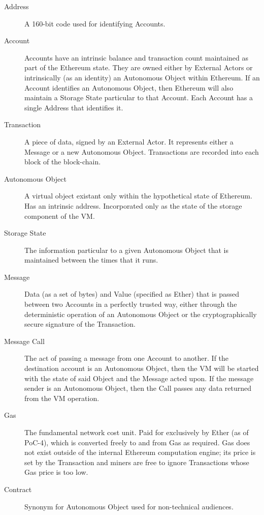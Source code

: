 \documentclass[9pt,oneside]{amsart}
\begin{document}
\begin{multicols}{2}
\begin{description}
\item[Address] A 160-bit code used for identifying Accounts.

\item[Account] Accounts have an intrinsic balance and transaction count maintained as part of the Ethereum state. They are owned either by External Actors or intrinsically (as an identity) an Autonomous Object within Ethereum. If an Account identifies an Autonomous Object, then Ethereum will also maintain a Storage State particular to that Account. Each Account has a single Address that identifies it.

\item[Transaction] A piece of data, signed by an External Actor. It represents either a Message or a new Autonomous Object. Transactions are recorded into each block of the block-chain.

\item[Autonomous Object] A virtual object existant only within the hypothetical state of Ethereum.  Has an intrinsic address. Incorporated only as the state of the storage component of the VM.

\item[Storage State] The information particular to a given Autonomous Object that is maintained between the times that it runs.

\item[Message] Data (as a set of bytes) and Value (specified as Ether) that is passed between two Accounts in a perfectly trusted way, either through the deterministic operation of an Autonomous Object or the cryptographically secure signature of the Transaction.

\item[Message Call] The act of passing a message from one Account to another. If the destination account is an Autonomous Object, then the VM will be started with the state of said Object and the Message acted upon. If the message sender is an Autonomous Object, then the Call passes any data returned from the VM operation.

\item[Gas] The fundamental network cost unit. Paid for exclusively by Ether (as of PoC-4), which is converted freely to and from Gas as required. Gas does not exist outside of the internal Ethereum computation engine; its price is set by the Transaction and miners are free to ignore Transactions whose Gas price is too low.

\item[Contract] Synonym for Autonomous Object used for non-technical audiences.


\end{description}
\end{multicols}
\end{document}
